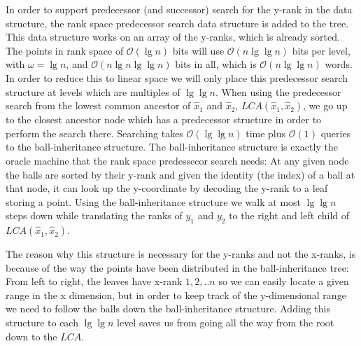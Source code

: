 In order to support predecessor (and successor) search for the y-rank in the data structure, the rank space predecessor search data structure is added to the tree. This data structure works on an array of the y-ranks, which is already sorted. The points in rank space of $\mathcal{O}(\lg n)$ bits will use $\mathcal{O}(n \lg \lg n)$ bits per level, with $\omega = \lg n$, and $\mathcal{O}(n \lg n \lg \lg n)$ bits in all, which is $\mathcal{O}(n \lg \lg n)$ words. In order to reduce this to linear space we will only place this predecessor search structure at levels which are multiples of $\lg \lg n$. When using the predecessor search from the lowest common ancestor of $\hat{x}_1$ and $\hat{x}_2$, $LCA(\hat{x}_1, \hat{x}_2)$, we go up to the closest ancestor node which has a predecessor structure in order to perform the search there. Searching takes $\mathcal{O}(\lg \lg n)$ time plus $\mathcal{O}(1)$ queries to the ball-inheritance structure. The ball-inheritance structure is exactly the oracle machine that the rank space predessecor search needs: At any given node the balls are sorted by their y-rank and given the identity (the index) of a ball at that node, it can look up the y-coordinate by decoding the y-rank to a leaf storing a point. Using the ball-inheritance structure we walk at most $\lg \lg n$ steps down while translating the ranks of $y_1$ and $y_2$ to the right and left child of $LCA(\hat{x}_1, \hat{x}_2)$. 

The reason why this structure is necessary for the y-ranks and not the x-ranks, is because of the way the points have been distributed in the ball-inheritance tree: From left to right, the leaves have x-rank $1,2,..n$ so we can easily locate a given range in the x dimension, but in order to keep track of the y-dimensional range we need to follow the balls down the ball-inheritance structure. Adding this structure to each $\lg \lg n$ level saves us from going all the way from the root down to the $LCA$. \\

